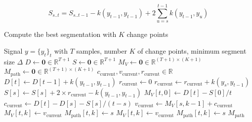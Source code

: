\documentclass[12pt]{article}
\newcommand\RR{\mathbb{R}}
\DeclarePairedDelimiter\floor{\lfloor}{\rfloor}
\begin{document}
\begin{equation}
    S_{s..t} = S_{s..t-1} - k(y_{t-1}, y_{t-1}) + 2\sum_{u=s}^{t-1} k(y_{t-1}, y_u)
\end{equation}
\begin{algorithm}
    \small
    \caption{Compute the best segmentation with $K$ change points}
    \label{alg:dynp_min_size} %
    \begin{algorithmic} %
        \REQUIRE Signal $y = \{y_t\}_t$ with $T$ samples, number $K$ of change points, minimum segment size $\Delta$
        \STATE {}
        \STATE $D \gets \bm{0}\in\mathbb{R}^{T+1}$ 
        \STATE $S \gets \bm{0}\in\mathbb{R}^{T+1}$ 
        \STATE $M_V \gets \bm{0}\in\mathbb{R}^{(T+1)\times (K+1)}$ 
        \STATE $M_{\text{path}} \gets \bm{0}\in\mathbb{R}^{(T+1)\times (K+1)}$ 
        \STATE $c_{\text{current}}, v_{\text{current}}, r_{\text{current}}\in\RR$ 
        \STATE
        \STATE {}
        \STATE
        \STATE {}
        \STATE $D[t] \gets D[t-1] + k(y_{t-1}, y_{t-1})$ 
        \STATE
        \STATE {}
        \STATE $r_{\text{current}}\gets0$
        \STATE $r_{\text{current}} \gets r_{\text{current}} + k(y_{s}, y_{t-1})$ 
        \STATE $S[s] \gets S[s] + 2\times r_{\text{current}} - k(y_{t-1}, y_{t-1}) $ 
        \ENDFOR
        \STATE
        \STATE {}
        \STATE $M_{V}[t, 0] \gets D[t] - S[0]/t$ 
        \STATE $c_{\text{current}} \gets D[t]-D[s] - S[s]/(t-s)$ 
        \STATE $v_{\text{current}} \gets M_V[s, k-1] + c_{\text{current}}$ 
        \STATE $M_V[t, k] \gets v_{\text{current}}$
        \STATE $M_{\text{path}}[t, k] \gets s$
        \ELSE
        \STATE $M_V[t, k] \gets v_{\text{current}}$
        \STATE $M_{\text{path}}[t, k] \gets s$
        \ENDIF
        \ENDIF
        \ENDFOR
        \ENDFOR
        \ENDFOR
        \RETURN $M_{\text{path}}$
    \end{algorithmic}
\end{algorithm}
\end{document}
